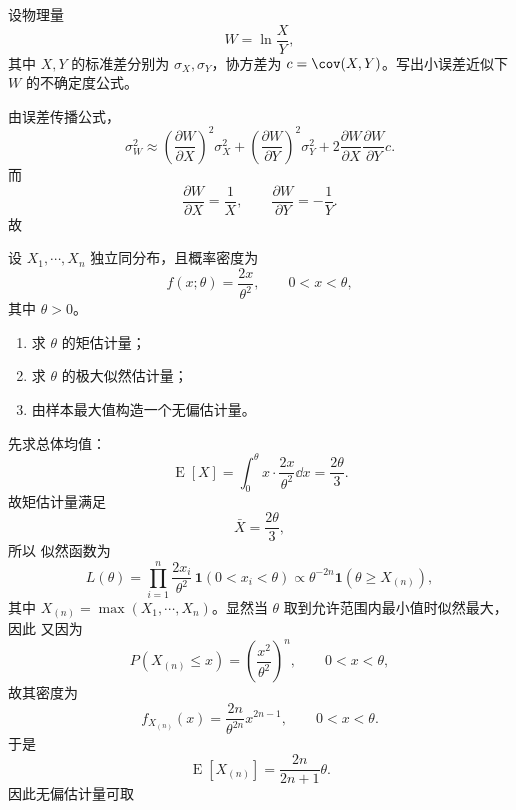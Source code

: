 ﻿

\begin{question}
设物理量
\[
W=\ln\frac{X}{Y},
\]
其中 $X,Y$ 的标准差分别为 $\sigma_X,\sigma_Y$，协方差为 $c=\cov(X,Y)$。写出小误差近似下 $W$ 的不确定度公式。
\begin{solution}
由误差传播公式，
\[
\sigma_W^2\approx
\left(\frac{\partial W}{\partial X}\right)^2\sigma_X^2+
\left(\frac{\partial W}{\partial Y}\right)^2\sigma_Y^2+
2\frac{\partial W}{\partial X}\frac{\partial W}{\partial Y}c.
\]
而
\[
\frac{\partial W}{\partial X}=\frac1X,
\qquad
\frac{\partial W}{\partial Y}=-\frac1Y.
\]
故
\end{solution}
\end{question}

\begin{question}
设 $X_1,\cdots,X_n$ 独立同分布，且概率密度为
\[
f(x;\theta)=\frac{2x}{\theta^2},\qquad 0<x<\theta,
\]
其中 $\theta>0$。
\begin{enumerate}
\item 求 $\theta$ 的矩估计量；
\item 求 $\theta$ 的极大似然估计量；
\item 由样本最大值构造一个无偏估计量。
\end{enumerate}
\begin{solution}
先求总体均值：
\[
\operatorname{E}[X]=\int_0^{\theta} x\cdot \frac{2x}{\theta^2}\dd{x}
=\frac{2\theta}{3}.
\]
故矩估计量满足
\[
\bar X=\frac{2\theta}{3},
\]
所以
似然函数为
\[
L(\theta)=\prod_{i=1}^n \frac{2x_i}{\theta^2}\,\mathbf 1(0<x_i<\theta)
\propto \theta^{-2n}\mathbf 1(\theta\ge X_{(n)}),
\]
其中 $X_{(n)}=\max(X_1,\cdots,X_n)$。显然当 $\theta$ 取到允许范围内最小值时似然最大，因此
又因为
\[
P(X_{(n)}\le x)=\left(\frac{x^2}{\theta^2}\right)^n,
\qquad 0<x<\theta,
\]
故其密度为
\[
f_{X_{(n)}}(x)=\frac{2n}{\theta^{2n}}x^{2n-1},
\qquad 0<x<\theta.
\]
于是
\[
\operatorname{E}[X_{(n)}]=\frac{2n}{2n+1}\theta.
\]
因此无偏估计量可取
\end{solution}
\end{question}

